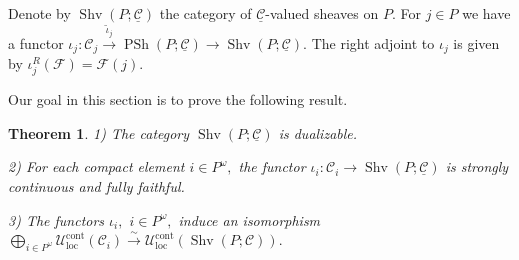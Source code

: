 \documentclass[11pt,leqno]{amsart}
\newtheorem{theo}{Theorem}[section]
\numberwithin{equation}{section}
\newcommand{\xto}{\xrightarrow}
\newcommand{\loc}{\operatorname{loc}}
\newcommand{\cont}{\operatorname{cont}}
\newcommand{\cF}{{\mathcal F}}
\newcommand{\cC}{{\mathcal C}}
\newcommand{\cU}{{\mathcal U}}
\newcommand{\un}{\underline}
\newcommand{\PSh}{\operatorname{PSh}}
\newcommand{\Sh}{\operatorname{Shv}}
\begin{document}
Denote by $\Sh(P;\un{\cC})$ the category of $\un{\cC}$-valued sheaves on $P.$ For $j\in P$ we have a functor $\iota_j:\cC_j\xto{\tilde{\iota}_j}\PSh(P;\un{\cC})\to \Sh(P;\un{\cC}).$ The right adjoint to $\iota_j$ is given by $\iota_j^R(\cF)=\cF(j).$ 

Our goal in this section is to prove the following result.

\begin{theo}\label{th:U_loc_sheaves_cont_posets} 1) The category $\Sh(P;\un{\cC})$ is dualizable.

2) For each compact element $i\in P^{\omega},$ the functor $\iota_i:\cC_i\to\Sh(P;\un{\cC})$ is strongly continuous and fully faithful.

3) The functors $\iota_i,$ $i\in P^{\omega},$ induce an isomorphism $\bigoplus\limits_{i\in P^{\omega}}\cU_{\loc}^{\cont}(\cC_i)\xto{\sim} \cU_{\loc}^{\cont}(\Sh(P;\cC)).$\end{theo}
\end{document}
